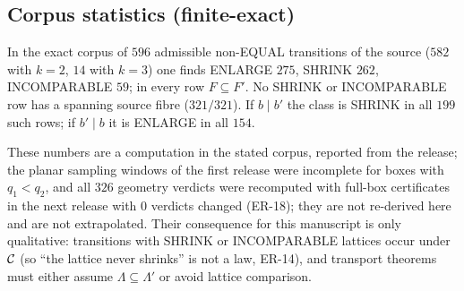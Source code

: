 \subsection{Corpus statistics (finite-exact)}
\begin{proposition}\label{prop:corpus}
In the exact corpus of $596$ admissible non-EQUAL transitions of the source ($582$ with $k=2$, $14$ with $k=3$) one finds ENLARGE $275$, SHRINK $262$, INCOMPARABLE $59$; in every row $F\subseteq F'$. No SHRINK or INCOMPARABLE row has a spanning source fibre ($321/321$). If $b\mid b'$ the class is SHRINK in all $199$ such rows; if $b'\mid b$ it is ENLARGE in all $154$.
\end{proposition}
These numbers are a computation in the stated corpus, reported from the release; the planar sampling windows of the first release were incomplete for boxes with $q_1<q_2$, and all $326$ geometry verdicts were recomputed with full-box certificates in the next release with $0$ verdicts changed (ER-18); they are not re-derived here and are not extrapolated. Their consequence for this manuscript is only qualitative: transitions with SHRINK or INCOMPARABLE lattices occur under $\mathcal C$ (so ``the lattice never shrinks'' is not a law, ER-14), and transport theorems must either assume $\Lambda\subseteq\Lambda'$ or avoid lattice comparison.
